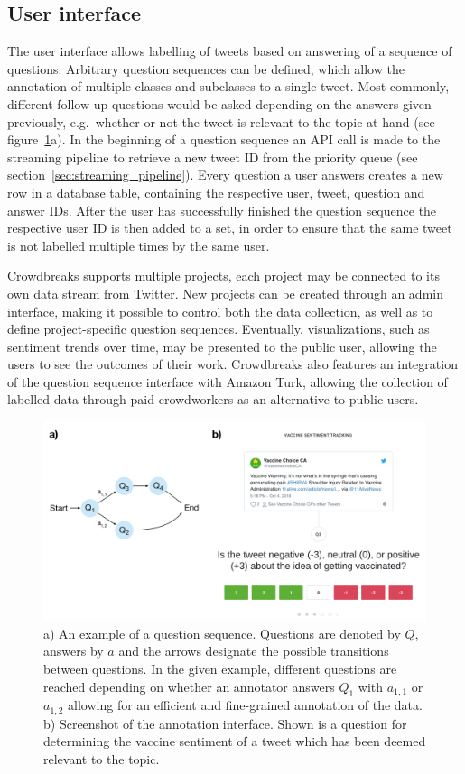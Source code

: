 \documentclass[a4paper, 11pt]{article}
\begin{document}
\subsection{User interface}
The user interface allows labelling of tweets based on answering of a sequence of questions.
Arbitrary question sequences can be defined, which allow the annotation of multiple classes and subclasses to a single tweet.
Most commonly, different follow-up questions would be asked depending on the answers given previously, e.g.\ whether or not the tweet is relevant to the topic at hand (see figure~\ref{fig:fig2}a). 
In the beginning of a question sequence an API call is made to the streaming pipeline to retrieve a new tweet ID from the priority queue (see section~\ref{sec:streaming_pipeline}).
Every question a user answers creates a new row in a database table, containing the respective user, tweet, question and answer IDs.
After the user has successfully finished the question sequence the respective user ID is then added to a set, in order to ensure that the same tweet is not labelled multiple times by the same user.\par
Crowdbreaks supports multiple projects, each project may be connected to its own data stream from Twitter.
New projects can be created through an admin interface, making it possible to control both the data collection, as well as to define project-specific question sequences.
Eventually, visualizations, such as sentiment trends over time, may be presented to the public user, allowing the users to see the outcomes of their work.
Crowdbreaks also features an integration of the question sequence interface with Amazon Turk, allowing the collection of labelled data through paid crowdworkers as an alternative to public users.

\begin{figure}
\centering
\includegraphics{figures/fig2.png}
  \caption{
    a) An example of a question sequence. Questions are denoted by $Q$, answers by $a$ and the arrows designate the possible transitions between questions. 
    In the given example, different questions are reached depending on whether an annotator answers $Q_1$ with $a_{1,1}$ or $a_{1,2}$ allowing for an efficient and fine-grained annotation of the data. 
    b) Screenshot of the annotation interface. Shown is a question for determining the vaccine sentiment of a tweet which has been deemed relevant to the topic.   
  }
  \label{fig:fig2}
\end{figure}
\end{document}
